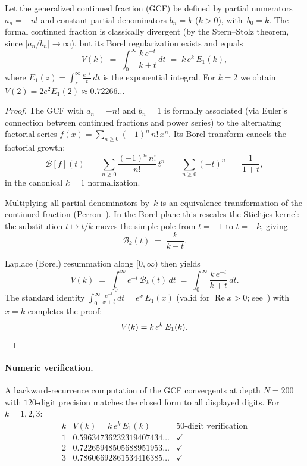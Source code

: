 %

\begin{lemma}\label{lem:borel-gcf}
Let the generalized continued fraction (GCF) be defined by partial numerators
$a_n = -n!$ and constant partial denominators $b_n = k$ ($k > 0$),
with~$b_0 = k$.  The formal continued fraction is classically divergent
(by the Stern--Stolz theorem, since $|a_n/b_n| \to \infty$),
but its Borel regularization exists and equals
\[
  V(k)
  \;=\;\int_{0}^{\infty}\frac{k\,e^{-t}}{k+t}\,dt
  \;=\; k\,e^{k}\,E_1(k),
\]
where\/ $E_1(z) = \displaystyle\int_z^{\infty}\frac{e^{-t}}{t}\,dt$
is the exponential integral.
For $k=2$ we obtain $V(2) = 2e^{2}E_1(2) \approx 0.72266\ldots$
\end{lemma}

\begin{proof}
The GCF with $a_n = -n!$ and $b_n = 1$ is formally associated
(via Euler's connection between continued fractions and power series)
to the alternating factorial series $f(x) = \sum_{n \ge 0} (-1)^n\,n!\,x^n$.
Its Borel transform cancels the factorial growth:
\[
  \mathcal{B}[f](t)
  \;=\;\sum_{n \ge 0}\frac{(-1)^n\,n!}{n!}\,t^n
  \;=\;\sum_{n \ge 0}(-t)^n
  \;=\;\frac{1}{1+t},
\]
in the canonical $k = 1$ normalization.

Multiplying all partial denominators by~$k$ is an equivalence
transformation of the continued fraction (Perron~\cite{Perron1957}).
In the Borel plane this rescales the Stieltjes kernel:
the substitution $t \mapsto t/k$ moves the simple pole from
$t = -1$ to $t = -k$, giving
\[
  \mathcal{B}_k(t) \;=\; \frac{k}{k+t}.
\]

Laplace (Borel) resummation along $[0,\infty)$ then yields
\[
  V(k)
  \;=\;\int_{0}^{\infty} e^{-t}\,\mathcal{B}_k(t)\,dt
  \;=\;\int_{0}^{\infty}\frac{k\,e^{-t}}{k+t}\,dt.
\]
The standard identity
$\displaystyle\int_0^\infty \frac{e^{-t}}{x+t}\,dt = e^{x}\,E_1(x)$
(valid for $\operatorname{Re} x > 0$; see~\cite[Ch.\,5]{DLMF})
with $x = k$ completes the proof:
\[
  V(k) = k\,e^{k}\,E_1(k). \qedhere
\]
\end{proof}

\paragraph{Numeric verification.}
A backward-recurrence computation of the GCF convergents at depth
$N = 200$ with $120$-digit precision matches the closed form to all
displayed digits.  For $k = 1,2,3$:
\[
\begin{array}{c|l|l}
k & V(k) = k\,e^k\,E_1(k) & \text{50-digit verification} \\
\hline
1 & 0.59634736232319407434\ldots & \checkmark \\
2 & 0.72265948505688951953\ldots & \checkmark \\
3 & 0.78606692861534416385\ldots & \checkmark
\end{array}
\]


